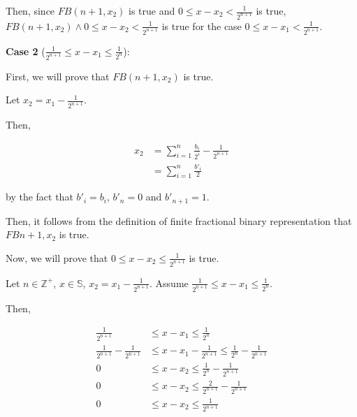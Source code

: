\documentclass[12pt]{article}
\begin{document}
\begin{enumerate}[a.]
    \bigskip

    Then, since $FB(n+1, x_2)$ is true and $0 \leq x - x_2 < \frac{1}{2^{n+1}}$ is true,
    $FB(n+1, x_2) \land 0 \leq x - x_2 < \frac{1}{2^{n+1}}$ is true for the case
    $0 \leq x - x_1 < \frac{1}{2^{n+1}}$.

    \bigskip

    \textbf{Case 2} ($\frac{1}{2^{n+1}} \leq x - x_1 \leq \frac{1}{2^{n}}$):

    \bigskip

    First, we will prove that $FB(n+1,x_2)$ is true.

    \bigskip

    Let $x_2 = x_1 - \frac{1}{2^{n+1}}$.

    \bigskip

    Then,

    \begin{align}
        x_2 &= \sum\limits_{i=1}^n \frac{b_i}{2^i} - \frac{1}{2^{n+1}}\\
        &= \sum\limits_{i=1}^n \frac{b'_i}{2}
    \end{align}

    by the fact that $b'_i = b_i$, $b'_n = 0$ and $b'_{n+1} = 1$.

    \bigskip

    Then, it follows from the definition of finite fractional binary representation that
    $FB{n+1,x_2}$ is true.

    \bigskip

    Now, we will prove that $0 \leq x - x_2 \leq \frac{1}{2^{n+1}}$ is true.

    \bigskip

    Let $n \in \mathbb{Z}^{+}$, $x \in \mathbb{S}$, $x_2 = x_1 - \frac{1}{2^{n+1}}$.
    Assume $\frac{1}{2^{n+1}} \leq x - x_1 \leq \frac{1}{2^{n}}$.

    \bigskip

    Then,

    \begin{align}
        \frac{1}{2^{n+1}} &\leq x - x_1 \leq \frac{1}{2^{n}}\\
        \frac{1}{2^{n+1}} - \frac{1}{2^{n+1}} &\leq x - x_1 - \frac{1}{2^{n+1}} \leq \frac{1}{2^{n}} - \frac{1}{2^{n+1}}\\
        0 &\leq x - x_2 \leq \frac{1}{2^{n}} - \frac{1}{2^{n+1}}\\
        0 &\leq x - x_2 \leq \frac{2}{2^{n+1}} - \frac{1}{2^{n+1}}\\
        0 &\leq x - x_2 \leq \frac{1}{2^{n+1}}
    \end{align}


\end{enumerate}
\end{document}
